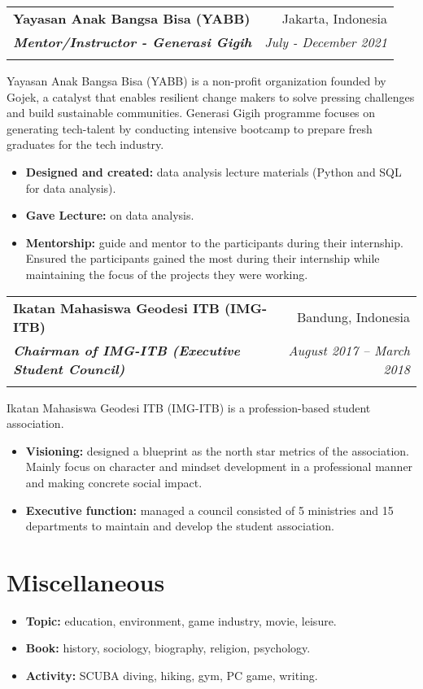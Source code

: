 \documentclass[a4paper, 11pt]{article}
\makeatletter
\newcommand{\resumeItem}[2]{
    \item\small{
        \textbf{#1}{#2 \vspace{-2pt}}
    }
}
\newcommand{\resumeSubheading}[4]{
    \vspace{-1pt}
    \begin{tabular*}{0.97\textwidth}{l@{\extracolsep{\fill}}r}
        \color{lightblue}\textbf{#1} & #2 \\
        \textbf{\textit{\small#3}} & \textit{\small #4} \\
        \textnormal{}\vspace{-5pt}
    \end{tabular*}\vspace{-5pt}
}
\newcommand{\resumeItemListStart}{\begin{itemize}[leftmargin=*]\setlength\itemsep{0em}\vspace{-1pt}}
\newcommand{\resumeItemListEnd}{\end{itemize}\vspace{-5pt}}
\makeatother
\begin{document}
    \resumeSubheading
    {Yayasan Anak Bangsa Bisa (YABB)}
    {Jakarta, Indonesia}
    {Mentor/Instructor - Generasi Gigih}
    {July - December 2021}
    {Yayasan Anak Bangsa Bisa (YABB) is a non-profit organization founded by Gojek, a catalyst that enables resilient change makers to
    solve pressing challenges and build sustainable communities. Generasi Gigih programme focuses on generating tech-talent by
    conducting intensive bootcamp to prepare fresh graduates for the tech industry.}
    \vspace{-5pt}
    \resumeItemListStart
    \resumeItem{Designed and created:}{ data analysis lecture materials (Python and SQL for data analysis).}
    \resumeItem{Gave Lecture:}{ on data analysis.}
    \resumeItem{Mentorship:}{ guide and mentor to the participants during their internship. Ensured the participants gained the most during their
    internship while maintaining the focus of the projects they were working.}
    \resumeItemListEnd

    \vspace{5pt}
    \resumeSubheading
    {Ikatan Mahasiswa Geodesi ITB (IMG-ITB)}
    {Bandung, Indonesia}
    {Chairman of IMG-ITB (Executive Student Council)}
    {August 2017 – March 2018}
    {Ikatan Mahasiswa Geodesi ITB (IMG-ITB) is a profession-based student association.}
    \vspace{-5pt}
    \resumeItemListStart
    \resumeItem{Visioning:}{ designed a blueprint as the north star metrics of the association. Mainly focus on character and mindset development in a
    professional manner and making concrete social impact.}
    \resumeItem{Executive function:}{ managed a council consisted of 5 ministries and 15 departments to maintain and develop the student association.}
    \resumeItemListEnd

    \vspace{-20pt}
    \section{Miscellaneous}

    \resumeItemListStart
    \resumeItem{Topic:}{ education, environment, game industry, movie, leisure.}
    \resumeItem{Book:}{ history, sociology, biography, religion, psychology.}
    \resumeItem{Activity:}{ SCUBA diving, hiking, gym, PC game, writing.}
    \resumeItemListEnd
\end{document}
